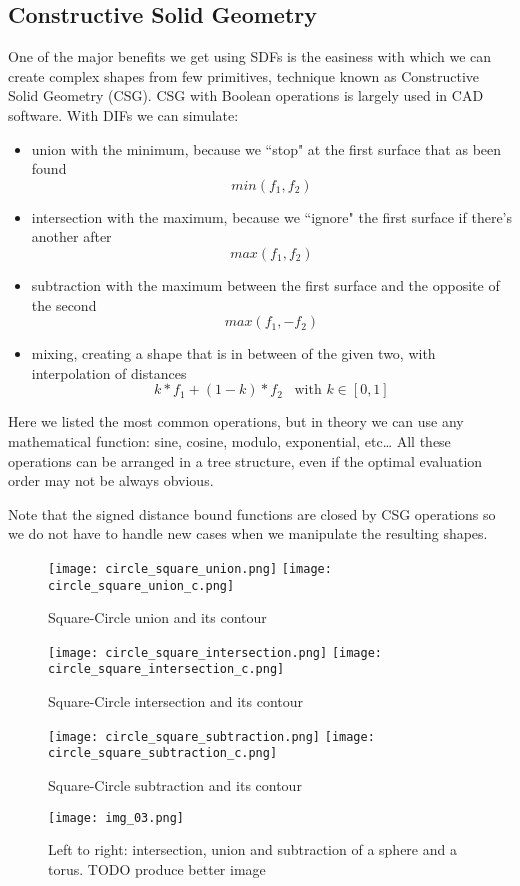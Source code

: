 \subsection{Constructive Solid Geometry}
One of the major benefits we get using SDFs is the easiness with which we can create complex shapes from few primitives, technique known as Constructive Solid Geometry (CSG).
CSG with Boolean operations is largely used in CAD software.
With DIFs we can simulate:
\begin{itemize}
  \item union with the minimum, because we ``stop" at the first surface that as been found
    $$ min(f_1, f_2) $$
  \item intersection with the maximum, because we ``ignore" the first surface if there's another after
    $$ max(f_1, f_2) $$
  \item subtraction with the maximum between the first surface and the opposite of the second
    $$ max(f_1, -f_2) $$

  \item mixing, creating a shape that is in between of the given two, with interpolation of distances
    $$ k*f_1 + (1-k) * f_2 \;\;\; \text{with $k\in[0,1]$} $$
\end{itemize}
Here we listed the most common operations, but in theory we can use any mathematical function: sine, cosine, modulo, exponential, etc\dots
All these operations can be arranged in a tree structure, even if the optimal evaluation order may not be always obvious.


Note that the signed distance bound functions are closed by CSG operations so we do not have to handle new cases when we manipulate the resulting shapes.

\begin{figure}[!htb]
  \texttt{[image: circle\_square\_union.png]}
  \texttt{[image: circle\_square\_union\_c.png]}
  \caption{Square-Circle union and its contour}\label{fig:union}
\endminipage\hfill
{}
  \texttt{[image: circle\_square\_intersection.png]}
  \texttt{[image: circle\_square\_intersection\_c.png]}
  \caption{Square-Circle intersection and its contour}
  \label{fig:intersection}
\endminipage\hfill
{}%
  \texttt{[image: circle\_square\_subtraction.png]}
  \texttt{[image: circle\_square\_subtraction\_c.png]}
  \caption{Square-Circle subtraction and its contour}
  \label{fig:subtraction}
\endminipage
\end{figure}
\begin{figure}[!htb]
  \centering
  \texttt{[image: img\_03.png]}
  \caption{Left to right:
    intersection, union and subtraction of a sphere and a torus.
    TODO produce better image
  }
  \label{fig:csg}
\end{figure}

